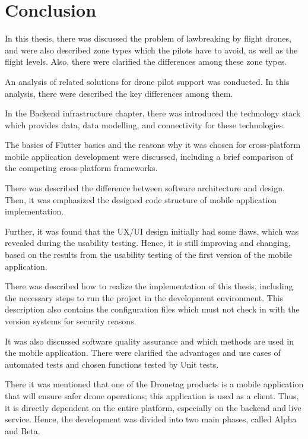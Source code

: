 \chapter{Conclusion}\label{ch:conclusion}
In this thesis, there was discussed the problem of lawbreaking by flight drones, and were also described zone types which the pilots have to avoid, as well as the flight levels.
Also, there were clarified the differences among these zone types.

An analysis of related solutions for drone pilot support was conducted.
In this analysis, there were described the key differences among them.

In the Backend infrastructure chapter, there was introduced the technology stack which provides data, data modelling, and connectivity for these technologies.

The basics of Flutter basics and the reasons why it was chosen for cross-platform mobile application development were discussed, including a brief comparison of the competing cross-platform frameworks.

There was described the difference between software architecture and design.
Then, it was emphasized the designed code structure of mobile application implementation.

Further, it was found that the UX/UI design initially had some flaws, which was revealed during the usability testing.
Hence, it is still improving and changing, based on the results from the usability testing of the first version of the mobile application.

There was described how to realize the implementation of this thesis, including the necessary steps to run the project in the development environment.
This description also contains the configuration files which must not check in with the version systems for security reasons.

It was also discussed software quality assurance and which methods are used in the mobile application.
There were clarified the advantages and use cases of automated tests and chosen functions tested by Unit tests.

There it was mentioned that one of the Dronetag products is a mobile application that will ensure safer drone operations;
this application is used as a client.
Thus, it is directly dependent on the entire platform, especially on the backend and live service.
Hence, the development was divided into two main phases, called Alpha and Beta.

